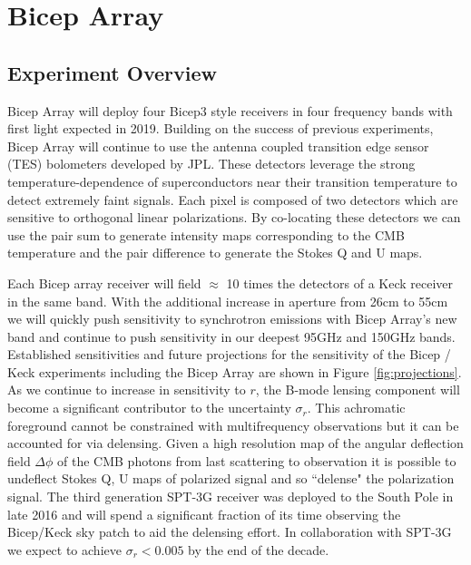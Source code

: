 \documentclass[12pt]{article}
\begin{document}

\section{Bicep Array}

\subsection{Experiment Overview}
Bicep Array will deploy four Bicep3 style receivers in four frequency bands
with first light expected in 2019. Building on the success of previous
experiments, Bicep Array will continue to use the antenna coupled transition
edge sensor (TES) bolometers developed by JPL. These detectors leverage the strong
temperature-dependence of superconductors near their transition temperature to
detect extremely faint signals. Each pixel is composed of two detectors which
are sensitive to orthogonal linear polarizations. By co-locating these
detectors we can use the pair sum to generate intensity maps corresponding to
the CMB temperature and the pair difference to generate the Stokes Q and U
maps.

Each Bicep array receiver will field $\approx$ 10 times the detectors of a Keck
receiver in the same band. With the additional increase in aperture from 26cm to
55cm we will quickly push sensitivity to synchrotron emissions with Bicep Array's new band
and continue to push sensitivity in our deepest 95GHz and 150GHz bands.
Established sensitivities and future projections for the sensitivity of the
Bicep / Keck experiments including the Bicep Array are shown in Figure
\ref{fig:projections}. As we continue to increase in sensitivity to $r$, the
B-mode lensing component will become a significant contributor to the
uncertainty $\sigma _r$.
This achromatic foreground cannot be constrained with multifrequency
observations but it can be accounted for via delensing. Given a high
resolution map of the angular deflection field $\Delta \phi$ of the CMB
photons from last scattering to observation it is possible to undeflect Stokes
Q, U maps of polarized signal and so ``delense" the polarization signal. The
third generation SPT-3G receiver was deployed to the South Pole in late 2016 and
will spend a significant fraction of its time observing the Bicep/Keck sky
patch to aid the delensing effort. In collaboration with SPT-3G we expect to achieve
$\sigma _r <0.005$ by the end of the decade.
\end{document}
